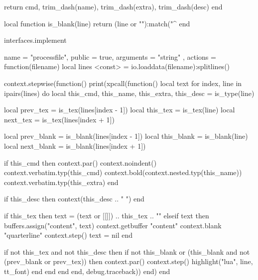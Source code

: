         return cmd, trim_dash(name), trim_dash(extra), trim_dash(desc)
    end

    local function is_blank(line)
        return (line or ""):match("^%
    end

    interfaces.implement {
        name = "processfile",
        public = true,
        arguments = { "string" },
        actions = function(filename)
            local lines <const> = io.loaddata(filename):splitlines()

            context.stepwise(function() print(xpcall(function()
                local text
                for index, line in ipairs(lines) do
                    local this_cmd, this_name, this_extra, this_desc = is_type(line)

                    local prev_tex = is_tex(lines[index - 1])
                    local this_tex = is_tex(line)
                    local next_tex = is_tex(lines[index + 1])

                    local prev_blank = is_blank(lines[index - 1])
                    local this_blank = is_blank(line)
                    local next_blank = is_blank(lines[index + 1])

                    if this_cmd then
                        context.par()
                        context.noindent()
                        context.verbatim.typ(this_cmd)
                        context.bold(context.nested.typ(this_name))
                        context.verbatim.typ(this_extra)
                    end

                    if this_desc then
                        context(this_desc .. " ")
                    end

                    if this_tex then
                        text = (text or [[\noindent ]]) .. this_tex .. "\n"
                    elseif text then
                        buffers.assign("content", text)
                        context.getbuffer { "content" }
                        context.blank { "quarterline" }
                        context.step()
                        text = nil
                    end

                    if not this_tex and not this_desc then
                        if not this_blank or
                           (this_blank and not (prev_blank or prev_tex))
                        then
                            context.par()
                            context.step()
                            highlight("lua", line, tt_font)
                        end
                    end
                end
            end, debug.traceback)) end)
        end
    }
\stopluacode

